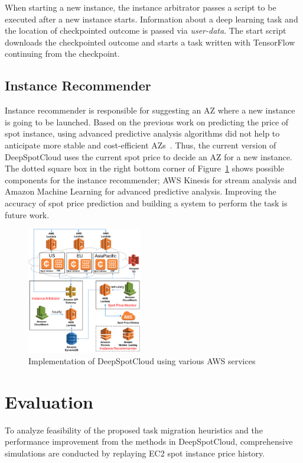 \documentclass[conference]{IEEEtran}
\begin{document}
When starting a new instance, the instance arbitrator passes a script to be executed after a new instance starts. Information about a deep learning task and the location of checkpointed outcome is passed via \emph{user-data}. The start script downloads the checkpointed outcome and starts a task written with TensorFlow continuing from the checkpoint. 

\subsection{Instance Recommender}
Instance recommender is responsible for suggesting an AZ where a new instance is going to be launched. Based on the previous work on predicting the price of spot instance, using advanced predictive analysis algorithms did not help to anticipate more stable and cost-efficient AZs~\cite{spot-instance-pricing-analysis}. Thus, the current version of DeepSpotCloud uses the current spot price to decide an AZ for a new instance. The dotted square box in the right bottom corner of Figure~\ref{fig:implementation} shows possible components for the instance recommender; AWS Kinesis for stream analysis and Amazon Machine Learning for advanced predictive analysis. Improving the accuracy of spot price prediction and building a system to perform the task is future work.

\begin{figure}
\centering\includegraphics[width=0.45\textwidth]{figures/implementation.pdf}\caption{\label{fig:implementation}Implementation of DeepSpotCloud using various AWS services}
\end{figure}

\section{Evaluation}\label{sec:eval}
To analyze feasibility of the proposed task migration heuristics and the performance improvement from the methods in DeepSpotCloud, comprehensive simulations are conducted by replaying EC2 spot instance price history.
\end{document}
